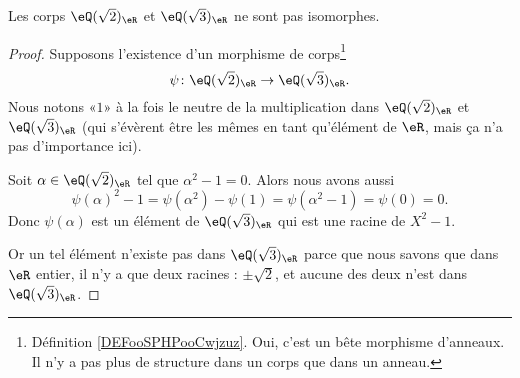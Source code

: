 \begin{lemma}   \label{LEMooKVPZooPqPrce}
    Les corps \( \eQ(\sqrt{ 2 })_{\eR}\) et \( \eQ(\sqrt{ 3 })_{\eR}\) ne sont pas isomorphes.
\end{lemma}

\begin{proof}
    Supposons l'existence d'un morphisme de corps\footnote{Définition \ref{DEFooSPHPooCwjzuz}. Oui, c'est un bête morphisme d'anneaux. Il n'y a pas plus de structure dans un corps que dans un anneau.}
    \begin{equation}
        \psi\colon \eQ(\sqrt{ 2 })_{\eR}\to \eQ(\sqrt{ 3 })_{\eR}.
    \end{equation}
    Nous notons «\( 1\)» à la fois le neutre de la multiplication dans \( \eQ(\sqrt{ 2 })_{\eR}\) et \( \eQ(\sqrt{ 3 })_{\eR}\) (qui s'évèrent être les mêmes en tant qu'élément de \( \eR\), mais ça n'a pas d'importance ici).

    Soit \( \alpha\in \eQ(\sqrt{ 2 })_{\eR}\) tel que \( \alpha^2-1=0\). Alors nous avons aussi
    \begin{equation}
        \psi(\alpha)^2-1=\psi(\alpha^2)-\psi(1)=\psi(\alpha^2-1)=\psi(0)=0.
    \end{equation}
    Donc \( \psi(\alpha)\) est un élément de \( \eQ(\sqrt{ 3 })_{\eR}\) qui est une racine de \( X^2-1\).

    Or un tel élément n'existe pas dans \( \eQ(\sqrt{ 3 })_{\eR}\) parce que nous savons que dans \( \eR\) entier, il n'y a que deux racines : \( \pm\sqrt{ 2 }\), et aucune des deux n'est dans \( \eQ(\sqrt{ 3 })_{\eR}\).
\end{proof}

